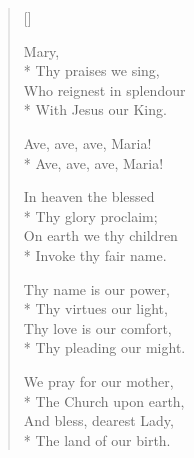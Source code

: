 \newHymn


\begin{verse}[\versewidth]

\begin{altverse}
 Mary,\\*
Thy praises we sing,\\
Who reignest in splendour\\*
With Jesus our King.
\end{altverse}




\begin{indentedVerse}
\vin Ave, ave, ave, Maria!\\*
\vin	Ave, ave, ave, Maria!
\end{indentedVerse}

\begin{altverse}
 In heaven the blessed\\*
Thy glory proclaim;\\
On earth we thy children\\*
Invoke thy fair name.
\end{altverse}

\begin{altverse}
 Thy name is our power,\\*
Thy virtues our light,\\
Thy love is our comfort,\\*
Thy pleading our might.
\end{altverse}

\begin{altverse}
 We pray for our mother,\\*
The Church upon earth,\\
And bless, dearest Lady,\\*
The land of our birth.
\end{altverse}


\end{verse}

